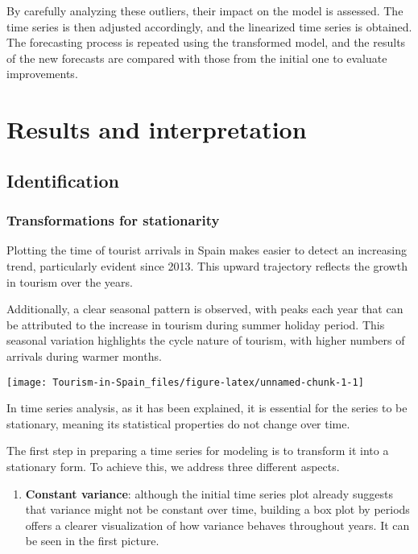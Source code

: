 \documentclass[
]{article}
\providecommand{\tightlist}{%
  \setlength{\itemsep}{0pt}\setlength{\parskip}{0pt}}
\begin{document}
By carefully analyzing these outliers, their impact on the model is
assessed. The time series is then adjusted accordingly, and the
linearized time series is obtained. The forecasting process is repeated
using the transformed model, and the results of the new forecasts are
compared with those from the initial one to evaluate improvements.

\newpage

\hypertarget{results-and-interpretation}{%
\section{Results and interpretation}\label{results-and-interpretation}}

\hypertarget{identification}{%
\subsection{Identification}\label{identification}}

\hypertarget{transformations-for-stationarity}{%
\subsubsection{Transformations for
stationarity}\label{transformations-for-stationarity}}

Plotting the time of tourist arrivals in Spain makes easier to detect an
increasing trend, particularly evident since 2013. This upward
trajectory reflects the growth in tourism over the years.

Additionally, a clear seasonal pattern is observed, with peaks each year
that can be attributed to the increase in tourism during summer holiday
period. This seasonal variation highlights the cycle nature of tourism,
with higher numbers of arrivals during warmer months.

\begin{center}\texttt{[image: Tourism-in-Spain\_files/figure-latex/unnamed-chunk-1-1]} \end{center}

In time series analysis, as it has been explained, it is essential for
the series to be stationary, meaning its statistical properties do not
change over time.

The first step in preparing a time series for modeling is to transform
it into a stationary form. To achieve this, we address three different
aspects.

\begin{enumerate}
\def\labelenumi{\arabic{enumi}.}
\tightlist
\item
  \textbf{Constant variance}: although the initial time series plot
  already suggests that variance might not be constant over time,
  building a box plot by periods offers a clearer visualization of how
  variance behaves throughout years. It can be seen in the first
  picture.
\end{enumerate}
\end{document}
